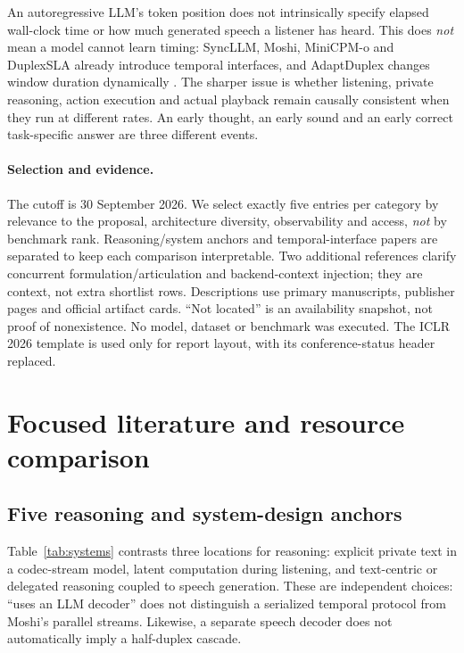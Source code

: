 \documentclass{article}
\begin{document}
An autoregressive LLM's token position does not intrinsically specify elapsed wall-clock time or how much generated speech a listener has heard. This does \emph{not} mean a model cannot learn timing: SyncLLM, Moshi, MiniCPM-o and DuplexSLA already introduce temporal interfaces, and AdaptDuplex changes window duration dynamically \citep{syncllm,moshi,minicpm,duplexsla,adapt}. The sharper issue is whether listening, private reasoning, action execution and actual playback remain causally consistent when they run at different rates. An early thought, an early sound and an early correct task-specific answer are three different events.

\paragraph{Selection and evidence.}
The cutoff is 30 September 2026. We select exactly five entries per category by relevance to the proposal, architecture diversity, observability and access, \emph{not} by benchmark rank. Reasoning/system anchors and temporal-interface papers are separated to keep each comparison interpretable. Two additional references clarify concurrent formulation/articulation and backend-context injection; they are context, not extra shortlist rows. Descriptions use primary manuscripts, publisher pages and official artifact cards. ``Not located'' is an availability snapshot, not proof of nonexistence. No model, dataset or benchmark was executed. The ICLR 2026 template is used only for report layout, with its conference-status header replaced.

\section{Focused literature and resource comparison}
\label{sec:review}
\subsection{Five reasoning and system-design anchors}

Table~\ref{tab:systems} contrasts three locations for reasoning: explicit private text in a codec-stream model, latent computation during listening, and text-centric or delegated reasoning coupled to speech generation. These are independent choices: ``uses an LLM decoder'' does not distinguish a serialized temporal protocol from Moshi's parallel streams. Likewise, a separate speech decoder does not automatically imply a half-duplex cascade.
\end{document}
